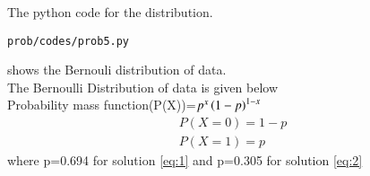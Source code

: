 \begin{enumerate}[label=\arabic*.,ref=\thesubsubsection.\theenumi]
\begin{enumerate}
\end{enumerate}
The python code for the distribution.
\begin{lstlisting}
prob/codes/prob5.py
\end{lstlisting}
shows the Bernouli distribution of data.
\\
The Bernoulli Distribution of data is given below
\\
Probability mass function(P(X))=$p^x\left(1-p\right)^{1-x}$
\begin{align}
P(X=0)=1-p
\\
P(X=1)=p
\end{align}
where p=0.694 for solution \ref{eq:1} and p=0.305 for  solution \ref{eq:2}
\end{enumerate}